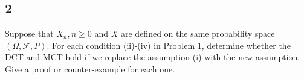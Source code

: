 \documentclass[12pt]{article}
\begin{document}

\subsection*{2}
\begin{tcolorbox}
  Suppose that $X_n, n \geq 0$ and $X$ are defined on the same probability space $(\Omega, \mathcal{F}, P)$. For each condition (ii)-(iv) in Problem 1, determine whether the DCT and MCT hold if we replace the assumption (i) with the new assumption. Give a proof or counter-example for each one.
\end{tcolorbox}
\end{document}
